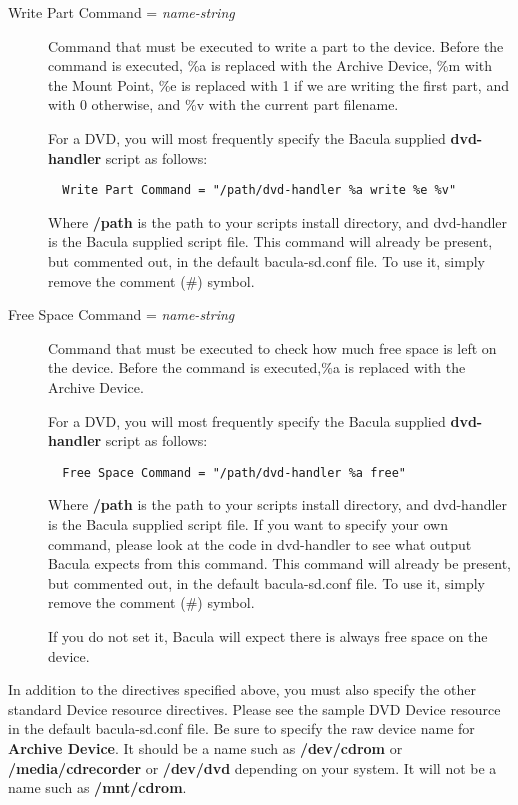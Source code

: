 \begin{description}
\item [Write Part Command = {\it name-string}]
   Command that must be executed to write a part to the device. Before the 
   command is executed, \%a is replaced with the Archive Device, \%m with the 
   Mount Point, \%e is replaced with 1 if we are writing the first part,
   and with 0 otherwise, and \%v with the current part filename.

   For a DVD, you will most frequently specify the Bacula supplied  {\bf
   dvd-handler} script as follows:  

\footnotesize
\begin{verbatim}
  Write Part Command = "/path/dvd-handler %a write %e %v"
\end{verbatim}
\normalsize

  Where {\bf /path} is the path to your scripts install directory, and
  dvd-handler is the Bacula supplied script file.  
  This command will already be present, but commented out,
  in the default bacula-sd.conf file. To use it, simply remove
  the comment (\#) symbol.


\item [Free Space Command = {\it name-string}]
   Command that must be executed to check how much free space is left on the 
   device. Before the command is executed,\%a is replaced with the Archive
   Device.

   For a DVD, you will most frequently specify the Bacula supplied  {\bf
   dvd-handler} script as follows:  

\footnotesize
\begin{verbatim}
  Free Space Command = "/path/dvd-handler %a free"
\end{verbatim}
\normalsize

  Where {\bf /path} is the path to your scripts install directory, and
  dvd-handler is the Bacula supplied script file.
  If you want to specify your own command, please look at the code in
  dvd-handler to see what output Bacula expects from this command.
  This command will already be present, but commented out,
  in the default bacula-sd.conf file. To use it, simply remove
  the comment (\#) symbol.

  If you do not set it, Bacula will expect there is always free space on the
  device. 

\end{description}

In addition to the directives specified above, you must also
specify the other standard Device resource directives. Please see the
sample DVD Device resource in the default bacula-sd.conf file. Be sure
to specify the raw device name for {\bf Archive Device}. It should 
be a name such as {\bf /dev/cdrom} or {\bf /media/cdrecorder} or
{\bf /dev/dvd} depending on your system.  It will not be a name such
as {\bf /mnt/cdrom}.

